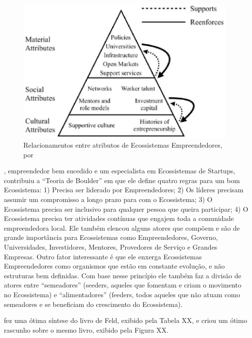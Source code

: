 \begin{figure}[!htb]
\centering
\includegraphics[width=11cm,angle=0]{figuras/relationship_among_ecosystems_attributes}
\caption{Relacionamentos entre atributos de Ecossistemas Empreendedores, por }
\label{figure:relationship_among_ecosystems_attributes}
\end{figure}

, empreendedor bem sucedido e um especialista em Ecossistemas de Startups, contribuiu a ``Teoria de Boulder'' em que ele define quatro regras para um bom Ecossistema: 1) Precisa ser liderado por Empreendedores; 2) Os líderes precisam assumir um compromisso a longo prazo para com o Ecossistema; 3) O Ecossistema precisa ser inclusivo para qualquer pessoa que queira participar; 4) O Ecossistema precisa ter atividades contínuas que engajem toda a comunidade empreendedora local. Ele também elencou alguns atores que compõem e são de grande importância para Ecossistemas como Empreendedores, Governo, Universidades, Investidores, Mentores, Provedores de Serviço e Grandes Empresas. Outro fator interessante é que ele enxerga Ecossistemas Empreendedores como organismos que estão em constante evolução, e não estruturas bem definidas. Com base nesse princípio ele também faz a divisão de atores entre ``semeadores'' (seeders, aqueles que fomentam e criam o movimento no Ecossistema) e ``alimentadores'' (feeders, todos aqueles que não atuam como semeadores e se beneficiam do crescimento do Ecossistema). 

 fez uma ótima síntese do livro de Feld, exibido pela Tabela XX, e  criou um ótimo rascunho sobre o mesmo livro, exibido pela Figura XX.

